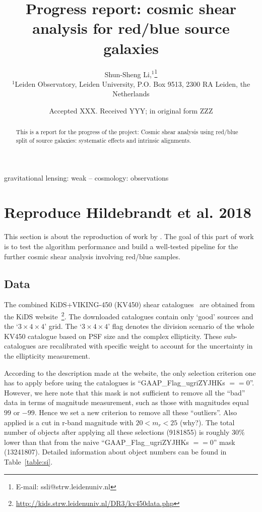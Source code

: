 \documentclass[fleqn,usenatbib]{mnras}
\title[Cosmic shear analysis]{Progress report: cosmic shear analysis for red/blue source galaxies}
\author[S.-S. Li]{
Shun-Sheng Li,$^{1}$\thanks{E-mail: ssli@strw.leidenuniv.nl}
\\
$^{1}$Leiden Observatory, Leiden University, P.O. Box 9513, 2300 RA Leiden, the Netherlands\\
}
\date{Accepted XXX. Received YYY; in original form ZZZ}
\newcommand{\R}{\color{red}}
\begin{document}
\label{firstpage}
\pagerange{\pageref{firstpage}--\pageref{lastpage}}
\maketitle

\begin{abstract}
This is a report for the progress of the project: Cosmic shear analysis using red/blue split of source galaxies: systematic effects and intrinsic alignments.
\end{abstract}

\begin{keywords}
gravitational lensing: weak -- cosmology: observations
\end{keywords}



\section{Reproduce Hildebrandt et al. 2018}
This section is about the reproduction of work by \citet{2018arXiv181206076H}. The goal of this part of work is to test the algorithm performance and build a well-tested pipeline for the further cosmic shear analysis involving red/blue samples.

\subsection{Data}
The combined KiDS+VIKING-450 (KV450) shear catalogues~\citep{2018arXiv181206077W} are obtained from the KiDS website~\footnote{\url{http://kids.strw.leidenuniv.nl/DR3/kv450data.php}}. The downloaded catalogues contain only `good' sources and the `$3\times 4\times 4$' grid. The `$3\times 4\times 4$' flag denotes the division scenario of the whole KV450 catalogue based on PSF size and the complex ellipticity. These sub-catalogues are recalibrated with specific weight to account for the uncertainty in the ellipticity measurement. 

According to the description made at the website, the only selection criterion one has to apply before using the catalogues is ``GAAP\_Flag\_ugriZYJHKs $==0$''. However, we here note that this mask is not sufficient to remove all the ``bad'' data in terms of magnitude measurement, such as those with magnitudes equal $99$ or $-99$. Hence we set a new criterion to remove all these ``outliers''. Also applied is a cut in r-band magnitude with $20<m_r<25$ ({\R why?}). The total number of objects after applying all these selections (\num{9181855}) is roughly $30\%$ lower than that from the naive ``GAAP\_Flag\_ugriZYJHKs $==0$'' mask (\num{13241807}). Detailed information about object numbers can be found in Table~\ref{table:si}.
\end{document}
